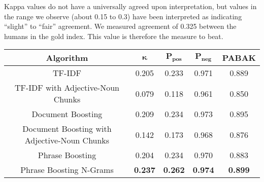 Kappa values do not have a universally agreed upon interpretation, but
values in the range we observe (about 0.15 to 0.3) have been
interpreted as indicating ``slight'' to ``fair'' agreement. We measured
agreement of 0.325 between the humans in the gold index. This value is
therefore the measure to beat.



\begin{figure*}[!htbp]
\caption{}
\label{fig:main_result}
\begin{tabular}{|c|c|c|c|c|}
\hline
\textbf{Algorithm} & $\mathbf{\kappa}$ & $\mathbf{P_{\text{pos}}}$ & $\mathbf{P_{\text{neg}}}$ & \textbf{PABAK} \\
\hline
TF-IDF & 0.205 & 0.233 & 0.971 & 0.889 \\
\hline
TF-IDF with Adjective-Noun Chunks & 0.079 & 0.118 & 0.961 & 0.850 \\
\hline
Document Boosting & 0.209 & 0.234 & 0.973 & 0.895 \\
\hline
Document Boosting with Adjective-Noun Chunks & 0.142 & 0.173 & 0.968 & 0.876 \\
\hline
Phrase Boosting & 0.204 & 0.234 & 0.970 & 0.883 \\
\hline
Phrase Boosting N-Grams & \textbf{0.237} & \textbf{0.262} & \textbf{0.974} & \textbf{0.899} \\
\hline
\end{tabular}
\end{figure*}

